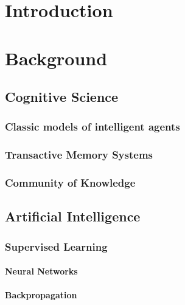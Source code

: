 \chapter{Introduction}



\chapter{Background}

\section{Cognitive Science}
\subsection{Classic models of intelligent agents}
\subsection{Transactive Memory Systems}
\subsection{Community of Knowledge}



\section{Artificial Intelligence}
\subsection{Supervised Learning}
\subsubsection{Neural Networks}
\subsubsection{Backpropagation}

